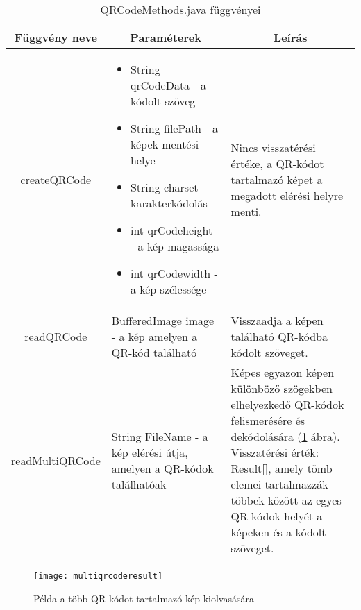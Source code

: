 \documentclass[../documentation.tex]{subfiles}
\begin{document}
\begin{table}[h]
\centering
\renewcommand\tabularxcolumn[1]{m{#1}}%
\begin{tabularx}{\linewidth}{|c|X|X|}
\hline \multicolumn{1}{|c|}{\textbf{Függvény neve}} & \multicolumn{1}{c|}{\textbf{Paraméterek}} & \multicolumn{1}{c|}{\textbf{Leírás}}\tabularnewline \hline
createQRCode & 
\begin{itemize} \item String qrCodeData - a kódolt szöveg
					\item String filePath - a képek mentési helye
					\item String charset - karakterkódolás
					\item int qrCodeheight - a kép magassága
					\item int qrCodewidth - a kép szélessége
\end{itemize} & Nincs visszatérési értéke, a QR-kódot tartalmazó képet a megadott elérési helyre menti. \tabularnewline \hline
readQRCode & BufferedImage image - a kép amelyen a QR-kód található & Visszaadja a képen található QR-kódba kódolt szöveget. \tabularnewline \hline
readMultiQRCode & String FileName - a kép elérési útja, amelyen a QR-kódok találhatóak & Képes egyazon képen különböző szögekben elhelyezkedő QR-kódok felismerésére és dekódolására (\ref{fig:multiqrcoderead} ábra). Visszatérési érték: Result[], amely tömb elemei tartalmazzák többek között az egyes QR-kódok helyét a képeken és a kódolt szöveget. \tabularnewline \hline
\end{tabularx}
\caption{QRCodeMethods.java függvényei}
\label{tab:qrcodemethods}
\end{table}

\begin{figure}[h]
\centering
{}
\texttt{[image: multiqrcoderesult]}
\caption{Példa a több QR-kódot tartalmazó kép kiolvasására}
\label{fig:multiqrcoderead}
\end{figure}
\end{document}
